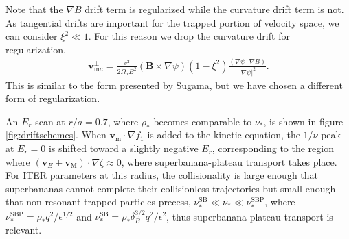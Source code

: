\documentclass[aip, pop, preprint]{revtex4-1}
\numberwithin{figure}{section}
\numberwithin{equation}{section}
\newcommand{\partder}[2]{\dfrac{\partial  #1}{\partial  #2}} %
\begin{document}
Note that the $\nabla B$ drift term is regularized while the curvature drift term is not. As tangential drifts are important for the trapped portion of velocity space, we can consider $\xi^2 \ll 1$. For this reason we drop the curvature drift for regularization,
\begin{gather}
\bm{v}_{\mathrm{m}a}^{\perp} = \frac{v^2}{2\Omega_aB^2} (\bm{B} \times \nabla \psi) (1 - \xi^2) \frac{(\nabla \psi \cdot \nabla B)}{\rvert \nabla \psi \rvert^2}.
\label{eq:mds5}
\end{gather}
This is similar to the form presented by Sugama,\cite{Sugama2016} but we have chosen a different form of regularization. 

An $E_r$ scan at $r/a = 0.7$, where $\rho_*$ becomes comparable to $\nu_*$, is shown in figure \ref{fig:driftschemes}. When $\bm{v}_{\mathrm{m}} \cdot \nabla f_1$ is added to the kinetic equation, the $1/\nu$ peak at $E_r = 0$ is shifted toward a slightly negative $E_r$, corresponding to the region where $(\bm{v}_E + \bm{v}_\mathrm{M})\cdot \nabla \zeta \approx 0$, where superbanana-plateau transport takes place. For ITER parameters at this radius, the collisionality is large enough that superbananas cannot complete their collisionless trajectories but small enough that non-resonant trapped particles precess, $\nu_*^{\mathrm{SB}} \ll \nu_* \ll \nu_*^{\mathrm{SBP}}$, where $\nu_*^{\mathrm{SBP}} = \rho_*q^2/\epsilon^{1/2}$ and $\nu_*^{\mathrm{SB}} = \rho_* \delta_B^{3/2} q^2/\epsilon^2$,\cite{Shaing2009_sb, Shaing2009_sbp} thus superbanana-plateau transport is relevant.
\end{document}
